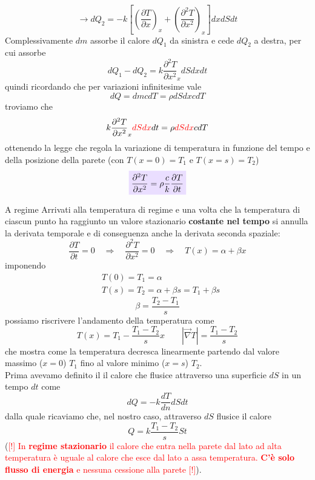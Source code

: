 \documentclass[x11names]{article}
\newcommand{\viola}[1]{\colorbox{yred}{$\displaystyle #1$}}
\begin{document}
	\[ 
	\to dQ_2 = -k\left[\left(\frac{\partial T}{\partial x}\right)_x + \left(\frac{\partial^2 T}{\partial x^2}\right)_{x}\right]dxdSdt
	\]
	Complessivamente \(dm\) assorbe il calore \(dQ_1\) da sinistra e cede \(dQ_2\) a destra, per cui assorbe 
	\[ 
	dQ_1 - dQ_2  = k\frac{\partial^2 T}{\partial x^2}_{x}dSdx dt
	\]
	quindi ricordando che per variazioni infinitesime vale
	\[ 
	dQ = dmcdT = \rho dS dx c dT
	\]
	troviamo che 
	\[ 
	k\frac{\partial^2 T}{\partial x^2}_{x}\textcolor{red}{dSdx} dt = \rho  \textcolor{red}{dSdx} c dT
	\]
	ottenendo la legge che regola la variazione di temperatura in funzione del tempo e della posizione della parete (con \(T(x=0) = T_1\) e \(T(x = s) = T_2\))
	\begin{equation}
		\viola{\frac{\partial^2 T}{\partial x^2} = \rho \frac{c}{k} \frac{\partial T}{\partial t}}
	\end{equation}
	\begin{es}{A regime}
		Arrivati alla temperatura di regime e una volta che la temperatura di ciascun punto ha raggiunto un valore stazionario \textbf{costante nel tempo} si annulla la derivata temporale e di conseguenza anche la derivata seconda spaziale:
		\[ 
		\frac{\partial T}{\partial t} = 0 \quad \Rightarrow \quad \frac{\partial^2 T}{\partial x^2} = 0\quad \Rightarrow \quad T(x) = \alpha + \beta x
		\]
		imponendo
		\begin{align*}
			&T(0) = T_1 = \alpha  \\
			&T(s) = T_2 = \alpha + \beta s = T_1 + \beta s
		\end{align*}
		\[ 
		\beta = \frac{T_2 - T_1}{s} 
		\]
		possiamo riscrivere l'andamento della temperatura come
		\[ 
		T(x) = T_1 - \frac{T_1 - T_2}{s}x \qquad |\overrightarrow{\nabla}T |= \frac{T_1 - T_2}{s}
		\]
		che mostra come la temperatura decresca linearmente partendo dal valore massimo (\(x=0\)) \(T_1\) fino al valore minimo (\(x=s\)) \(T_2\). \\
		
		Prima avevamo definito il il calore che flusice attraverso una superficie \(dS\) in un tempo \(dt\) come
		\[ 
		dQ = -k\frac{dT}{dn}dS dt
		\]
		dalla quale ricaviamo che, nel nostro caso, attraverso \(dS\) flusice il calore 
		\[ 
		Q = k\frac{T_1 - T_2}{s}St
		\](\textcolor{red}{[!] In \textbf{regime stazionario} il calore che entra nella parete dal lato ad alta temperatura è uguale al calore che esce dal lato a assa temperatura. \textbf{C'è solo flusso di energia} e nessuna cessione alla parete [!]}).
	\end{es}
	
\end{document}
